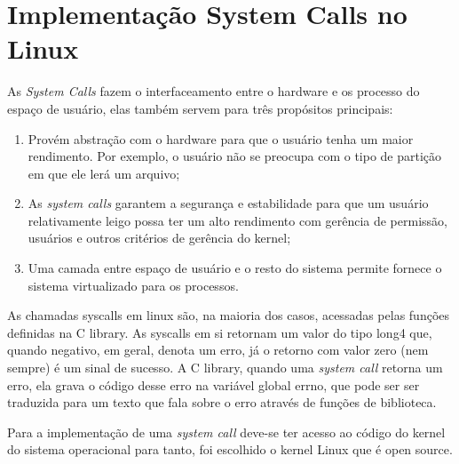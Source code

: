 \documentclass[12pt]{article}
\begin{document}
\section{Implementação \textbf{System Calls} no Linux}
As \textit{System Calls} fazem o interfaceamento entre o hardware e os processo do espaço de usuário, elas também servem para três propósitos principais:
\begin{enumerate}
	\item Provém abstração com o hardware para que o usuário tenha um maior rendimento. Por exemplo, o usuário não se preocupa com o tipo de partição em que ele lerá um arquivo;
	\item As \textit{system calls} garantem a segurança e estabilidade para que um usuário relativamente leigo possa ter um alto rendimento com gerência de permissão, usuários e outros critérios de gerência do kernel;
	\item Uma camada entre espaço de usuário e o resto do sistema permite fornece o sistema virtualizado para os processos.
\end{enumerate}
	As chamadas syscalls em linux são, na maioria dos casos, acessadas pelas funções definidas na C library. As syscalls em si retornam um valor do tipo long4 que, quando negativo, em geral, denota um erro, já o retorno com valor zero (nem sempre) é um sinal de sucesso. A C library, quando uma \textit{system call} retorna um erro, ela grava o código desse erro na variável global errno, que pode ser ser traduzida para um texto que fala sobre o erro através de funções de biblioteca.
	
	Para a implementação de uma \textit{system call} deve-se ter acesso ao código do kernel do sistema operacional para tanto, foi escolhido o kernel Linux que é open source.
\setcounter{secnumdepth}{-1}
\end{document}
